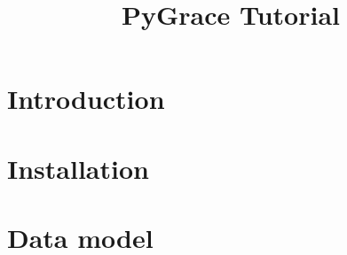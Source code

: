\documentclass[11pt]{article}
\title{PyGrace Tutorial}
\date{}
\begin{document}
\maketitle

\section*{Introduction}


\section*{Installation}


\section*{Data model}

\end{document}
